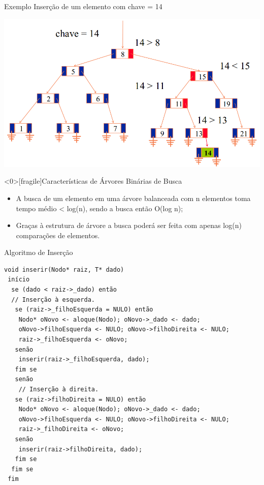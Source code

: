 \documentclass[12pt,table,xcolor={dvipsnames}]{beamer}
\begin{document}
\begin{frame}[fragile]{Exemplo}
Inserção de um elemento com chave = 14
\begin{center}
\includegraphics[scale=.3]{arv7.png} 
\end{center}
\end{frame}



\begin{frame}<0>[fragile]{Características de Árvores Binárias de Busca}
	\begin{itemize}
		\item A busca de um elemento em uma árvore balanceada com n elementos toma tempo médio < log(n), sendo a busca então O(log n);
		\item Graças à estrutura de árvore a busca poderá ser feita com apenas log(n) comparações de elementos.
	\end{itemize}
\end{frame}

\begin{frame}[fragile]{Algoritmo de Inserção}
          \begin{lstlisting}
void inserir(Nodo* raiz, T* dado)
 início
  se (dado < raiz->_dado) então
  // Inserção à esquerda.
   se (raiz->_filhoEsquerda = NULO) então
    Nodo* oNovo <- aloque(Nodo); oNovo->_dado <- dado;
    oNovo->filhoEsquerda <- NULO; oNovo->filhoDireita <- NULO;
    raiz->_filhoEsquerda <- oNovo;
   senão
    inserir(raiz->_filhoEsquerda, dado);
   fim se
   senão
    // Inserção à direita.
   se (raiz->filhoDireita = NULO) então
    Nodo* oNovo <- aloque(Nodo); oNovo->_dado <- dado;
    oNovo->filhoEsquerda <- NULO; oNovo->filhoDireita <- NULO;
    raiz->_filhoDireita <- oNovo;
   senão
    inserir(raiz->filhoDireita, dado);
   fim se
  fim se  
 fim
 \end{lstlisting}
\end{frame} 
\end{document}
